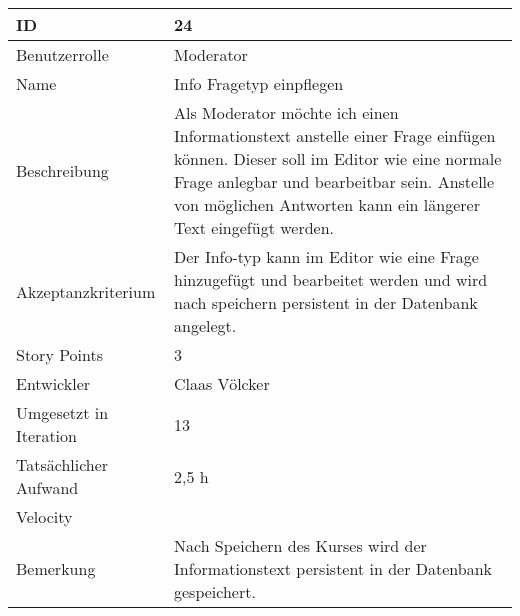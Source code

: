 \begin{tabularx}{\textwidth}{|p{}|X|}
	\hline
	ID & 24 \\
	\hline
	Benutzerrolle & Moderator \\
	\hline
	Name & Info Fragetyp einpflegen\\
	\hline
	Beschreibung & Als Moderator möchte ich einen Informationstext anstelle einer Frage einfügen können.
		Dieser soll im Editor wie eine normale Frage anlegbar und bearbeitbar sein.
		Anstelle von möglichen Antworten kann ein längerer Text eingefügt werden.\\
	\hline
	Akzeptanzkriterium & Der Info-typ kann im Editor wie eine Frage hinzugefügt und bearbeitet werden und wird nach speichern persistent in der Datenbank angelegt. \\
	\hline
	Story Points & 3 \\
	\hline
	Entwickler & Claas Völcker\\
	\hline
	Umgesetzt in Iteration & 13\\ 
	\hline
	Tatsächlicher Aufwand & 2,5 h\\
	\hline
	Velocity & \\
	\hline
	Bemerkung & Nach Speichern des Kurses wird der Informationstext persistent in der Datenbank gespeichert.\\
	\hline
\end{tabularx}
\vspace{20pt}
